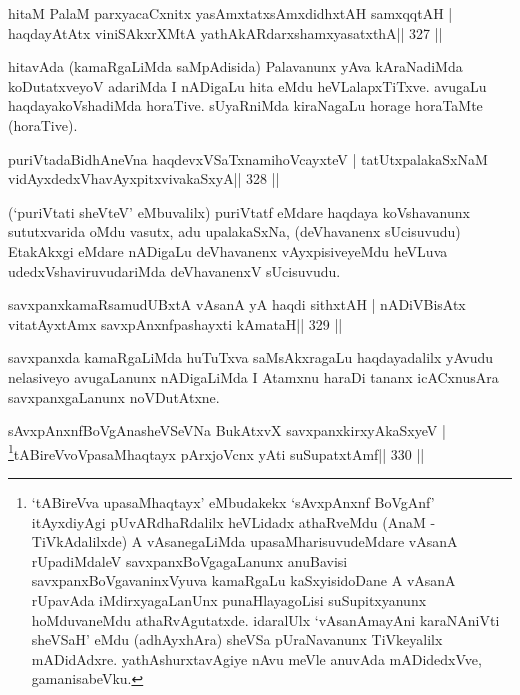 
\begin{shl}
hitaM PalaM parxyacaCxnitx yasAmxtatxsAmxdidhxtAH samxqqtAH |
haqdayAtAtx viniSAkxrXMtA yathA\s kARdarxshamxyasatxthA\hfill || 327 ||
\end{shl}

\begin{artha}
hitavAda (kamaRgaLiMda saMpAdisida) Palavanunx yAva kAraNadiMda 
koDutatxveyoV adariMda I nADigaLu hita eMdu heVLalapxTiTxve. avugaLu 
haqdayakoVshadiMda horaTive. sUyaRniMda kiraNagaLu horage horaTaMte 
(horaTive). 
\end{artha}


\begin{shl}
puriVtadaBidhAneVna haqdevxVSaTxnamihoVcayxteV |
tatUtxpalakaSxNaM vidAyxdedxVhavAyxpitxvivakaSxyA\hfill || 328 ||
\end{shl}

\begin{artha}
(`puriVtati sheVteV' eMbuvalilx) puriVtatf eMdare haqdaya koVshavanunx 
sututxvarida oMdu vasutx, adu upalakaSxNa, (deVhavanenx sUcisuvudu) EtakAkxgi eMdare nADigaLu deVhavanenx vAyxpisiveyeMdu heVLuva udedxVshaviruvudariMda deVhavanenxV sUcisuvudu.
\end{artha}

\begin{shl}
savxpanxkamaRsamudUBxtA vAsanA yA haqdi sithxtAH |
nADiVBisAtx vitatAyx\s\s tAmx savxpAnxnfpashayxti  kAmataH\hfill || 329 ||
\end{shl}

\begin{artha}
savxpanxda kamaRgaLiMda huTuTxva saMsAkxragaLu haqdayadalilx yAvudu nelasiveyo avugaLanunx nADigaLiMda I Atamxnu haraDi tananx icACxnusAra savxpanxgaLanunx noVDutAtxne.
\end{artha}


\begin{shl}
sAvxpAnxnfBoVgAnasheVSeVNa BukAtxvX savxpanxkirxyAkaSxyeV |
\footnote{`tABireVva upasaMhaqtayx' eMbudakekx `sAvxpAnxnf  BoVgAnf' itAyxdiyAgi pUvARdhaRdalilx heVLidadx athaRveMdu (AnaM -  TiVkAdalilxde) A vAsanegaLiMda upasaMharisuvudeMdare vAsanA  rUpadiMdaleV savxpanxBoVgagaLanunx anuBavisi savxpanxBoVgavaninxVyuva  kamaRgaLu kaSxyisidoDane A vAsanA rUpavAda iMdirxyagaLanUnx  punaHlayagoLisi suSupitxyanunx hoMduvaneMdu athaRvAgutatxde. idaralUlx  `vAsanAmayAni karaNAniVti sheVSaH' eMdu (adhAyxhAra) sheVSa pUraNavanunx TiVkeyalilx mADidAdxre. yathAshurxtavAgiye nAvu meVle anuvAda mADidedxVve, gamanisabeVku.}tABireVvoVpasaMhaqtayx pArxjoVcnx yAti suSupatxtAmf\hfill || 330 ||
\end{shl}

